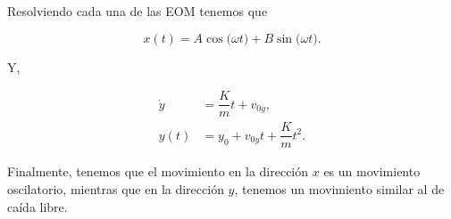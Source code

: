 \documentclass[../main.tex]{subfiles}
\begin{document}
\begin{problema}
	Resolviendo cada una de las EOM tenemos que

	\begin{equation*}
		x(t) = A \cos\bigl(\omega t\bigr) + B \sin\bigl(\omega t\bigr).
	\end{equation*}

	Y,

	\begin{align*}
		\dot{y} & = \dfrac{K}{m}t + v_{0y},              \\
		y(t)    & = y_{0} + v_{0y}t + \dfrac{K}{m}t^{2}.
	\end{align*}

	Finalmente, tenemos que el movimiento en la dirección \(x\) es un
	movimiento oscilatorio, mientras que en la dirección \(y\),
	tenemos un movimiento similar al de caída libre.
\end{problema}
\end{document}
